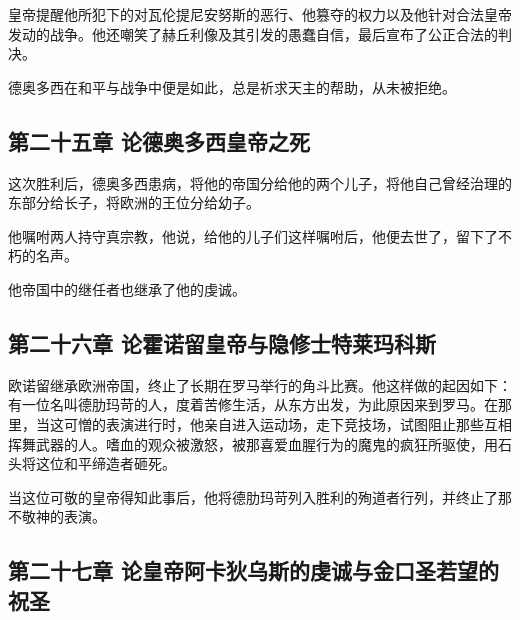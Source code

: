 皇帝提醒他所犯下的对瓦伦提尼安努斯的恶行、他篡夺的权力以及他针对合法皇帝发动的战争。他还嘲笑了赫丘利像及其引发的愚蠢自信，最后宣布了公正合法的判决。\par

德奥多西在和平与战争中便是如此，总是祈求天主的帮助，从未被拒绝。\par


\subsection{第二十五章 论德奥多西皇帝之死}

这次胜利后，德奥多西患病，将他的帝国分给他的两个儿子，将他自己曾经治理的东部分给长子，将欧洲的王位分给幼子。\par

他嘱咐两人持守真宗教，他说，给他的儿子们这样嘱咐后，他便去世了，留下了不朽的名声。\par

他帝国中的继任者也继承了他的虔诚。\par


\subsection{第二十六章 论霍诺留皇帝与隐修士特莱玛科斯}

欧诺留继承欧洲帝国，终止了长期在罗马举行的角斗比赛。他这样做的起因如下：有一位名叫德肋玛苛的人，度着苦修生活，从东方出发，为此原因来到罗马。在那里，当这可憎的表演进行时，他亲自进入运动场，走下竞技场，试图阻止那些互相挥舞武器的人。嗜血的观众被激怒，被那喜爱血腥行为的魔鬼的疯狂所驱使，用石头将这位和平缔造者砸死。\par

当这位可敬的皇帝得知此事后，他将德肋玛苛列入胜利的殉道者行列，并终止了那不敬神的表演。\par


\subsection{第二十七章 论皇帝阿卡狄乌斯的虔诚与金口圣若望的祝圣}

